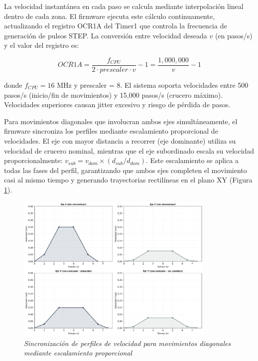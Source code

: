 La velocidad instantánea en cada paso se calcula mediante interpolación lineal dentro de cada zona. El firmware ejecuta este cálculo continuamente, actualizando el registro OCR1A del Timer1 que controla la frecuencia de generación de pulsos STEP. La conversión entre velocidad deseada $v$ (en pasos/s) y el valor del registro es:

\begin{equation}
OCR1A = \frac{f_{CPU}}{2 \cdot prescaler \cdot v} - 1 = \frac{1,000,000}{v} - 1
\end{equation}

donde $f_{CPU} = 16$ MHz y prescaler = 8. El sistema soporta velocidades entre 500 pasos/s (inicio/fin de movimientos) y 15,000 pasos/s (crucero máximo). Velocidades superiores causan jitter excesivo y riesgo de pérdida de pasos.

Para movimientos diagonales que involucran ambos ejes simultáneamente, el firmware sincroniza los perfiles mediante escalamiento proporcional de velocidades. El eje con mayor distancia a recorrer (eje dominante) utiliza su velocidad de crucero nominal, mientras que el eje subordinado escala su velocidad proporcionalmente: $v_{sub} = v_{dom} \times (d_{sub}/d_{dom})$. Este escalamiento se aplica a todas las fases del perfil, garantizando que ambos ejes completen el movimiento casi al mismo tiempo y generando trayectorias rectilíneas en el plano XY (Figura \ref{fig:sincronizacion_multieje}).

\begin{figure}[H]
    \centering
    \includegraphics[width=0.85\textwidth]{imagenes/sincronizacion_multieje.png}
    \caption{\textit{Sincronización de perfiles de velocidad para movimientos diagonales mediante escalamiento proporcional}}
    \label{fig:sincronizacion_multieje}
\end{figure}

